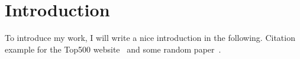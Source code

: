 \chapter{Introduction}
\label{chapter:introduction}

To introduce my work, I will write a nice introduction in the following.
Citation example for the Top500 website~\cite{top500} and some random paper~\cite{graham1969}.

\lipsum[1]
